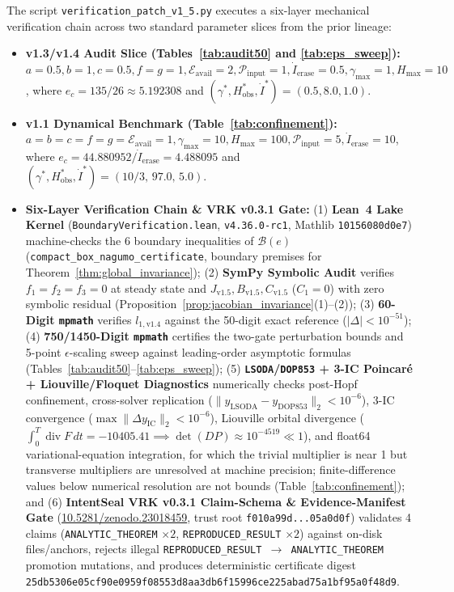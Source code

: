 \documentclass[11pt,a4paper]{article}
\theoremstyle{remark}
\begin{document}
The script \texttt{verification\_patch\_v1\_5.py} executes a six-layer mechanical verification chain across two standard parameter slices from the prior lineage:
\begin{itemize}
\setlength{\itemsep}{0.5pt}
    \item \textbf{v1.3/v1.4 Audit Slice (Tables~\ref{tab:audit50} and \ref{tab:eps_sweep}):} $a=0.5, b=1, c=0.5, f=g=1, \mathcal{E}_{\text{avail}}=2, \mathcal{P}_{\text{input}}=1, \dot{I}_{\text{erase}}=0.5, \gamma_{\max}=1, H_{\max}=10$, where $e_c = 135/26 \approx 5.192308$ and $(\gamma^*, H_{\text{obs}}^*, \dot{I}^*) = (0.5, 8.0, 1.0)$.
    \item \textbf{v1.1 Dynamical Benchmark (Table~\ref{tab:confinement}):} $a=b=c=f=g=\mathcal{E}_{\text{avail}}=1, \gamma_{\max}=10, H_{\max}=100, \mathcal{P}_{\text{input}}=5, \dot{I}_{\text{erase}}=10$, where $e_c = 44.880952/\dot{I}_{\text{erase}} = 4.488095$ and $(\gamma^*, H_{\text{obs}}^*, \dot{I}^*) = (10/3,\, 97.0,\, 5.0)$.
    \item \textbf{Six-Layer Verification Chain \& VRK v0.3.1 Gate:} (1) \textbf{Lean~4 Lake Kernel} (\texttt{Boundary\allowbreak Verification.lean}, \texttt{v4.36.0-rc1}, Mathlib \texttt{10156080d0e7}) machine-checks the 6 boundary inequalities of $\mathcal{B}(e)$ (\texttt{compact\_\allowbreak box\_\allowbreak nagumo\_\allowbreak certificate}, boundary premises for Theorem~\ref{thm:global_invariance}); (2) \textbf{SymPy Symbolic Audit} verifies $f_1=f_2=f_3=0$ at steady state and $J_{\text{v1.5}}, B_{\text{v1.5}}, C_{\text{v1.5}}$ ($C_1 = 0$) with zero symbolic residual (Proposition~\ref{prop:jacobian_invariance}(1)--(2)); (3) \textbf{60-Digit \texttt{mpmath}} verifies $l_{1,\text{v1.4}}$ against the 50-digit exact reference ($|\Delta| < 10^{-51}$); (4) \textbf{750/1450-Digit \texttt{mpmath}} certifies the two-gate perturbation bounds and 5-point $\epsilon$-scaling sweep against leading-order asymptotic formulas (Tables~\ref{tab:audit50}--\ref{tab:eps_sweep}); (5) \textbf{\texttt{LSODA}/\texttt{DOP853} + 3-IC Poincar\'e + Liouville/Floquet Diagnostics} numerically checks post-Hopf confinement, cross-solver replication ($\|y_{\text{LSODA}} - y_{\text{DOP853}}\|_2 < 10^{-6}$), 3-IC convergence ($\max\|\Delta y_{\text{IC}}\|_2 < 10^{-6}$), Liouville orbital divergence ($\int_0^T \operatorname{div} F\,dt = -10405.41 \implies \det(DP) \approx 10^{-4519} \ll 1$), and float64 variational-equation integration, for which the trivial multiplier is near 1 but transverse multipliers are unresolved at machine precision; finite-difference values below numerical resolution are not bounds (Table~\ref{tab:confinement}); and (6) \textbf{IntentSeal VRK v0.3.1 Claim-Schema \& Evidence-Manifest Gate} (\href{https://doi.org/10.5281/zenodo.23018459}{10.5281/zenodo.23018459}, trust root \texttt{f010a99d...05a0d0f}) validates 4 claims (\texttt{ANALYTIC\_THEOREM} $\times 2$, \texttt{REPRODUCED\_RESULT} $\times 2$) against on-disk files/anchors, rejects illegal \texttt{REPRODUCED\_RESULT $\to$ ANALYTIC\_THEOREM} promotion mutations, and produces deterministic certificate digest \texttt{25db5306e05cf90e0959f08553d8aa3db6f15996ce225abad75a1bf95a0f48d9}.
\end{itemize}
\end{document}
